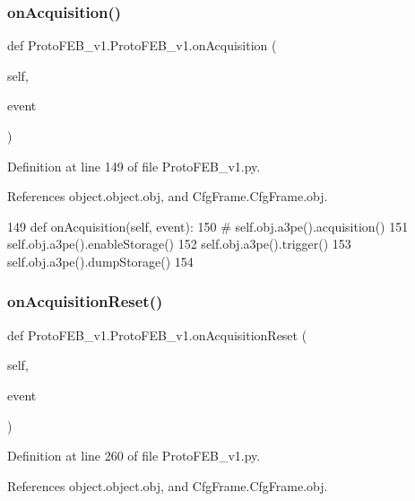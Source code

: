 \subsubsection{\texorpdfstring{on\+Acquisition()}{onAcquisition()}}
{\footnotesize\ttfamily def Proto\+F\+E\+B\+\_\+v1.\+Proto\+F\+E\+B\+\_\+v1.\+on\+Acquisition (\begin{DoxyParamCaption}\item[{}]{self,  }\item[{}]{event }\end{DoxyParamCaption})}



Definition at line 149 of file Proto\+F\+E\+B\+\_\+v1.\+py.



References object.\+object.\+obj, and Cfg\+Frame.\+Cfg\+Frame.\+obj.


\begin{DoxyCode}
149     \textcolor{keyword}{def }onAcquisition(self, event):
150 \textcolor{comment}{#        self.obj.a3pe().acquisition()}
151         self.obj.a3pe().enableStorage()
152         self.obj.a3pe().trigger()
153         self.obj.a3pe().dumpStorage()
154 
\end{DoxyCode}
\mbox{\label{classProtoFEB__v1_1_1ProtoFEB__v1_a11a6f30c362bd2261ab1ea60a04b36f4}} 
\subsubsection{\texorpdfstring{on\+Acquisition\+Reset()}{onAcquisitionReset()}}
{\footnotesize\ttfamily def Proto\+F\+E\+B\+\_\+v1.\+Proto\+F\+E\+B\+\_\+v1.\+on\+Acquisition\+Reset (\begin{DoxyParamCaption}\item[{}]{self,  }\item[{}]{event }\end{DoxyParamCaption})}



Definition at line 260 of file Proto\+F\+E\+B\+\_\+v1.\+py.



References object.\+object.\+obj, and Cfg\+Frame.\+Cfg\+Frame.\+obj.


